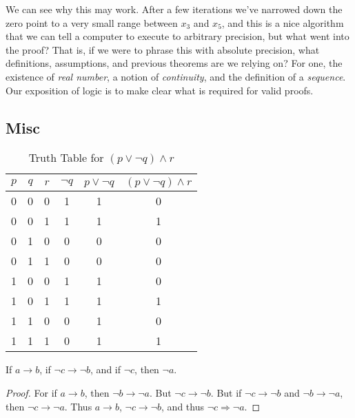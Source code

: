     We can see why this may work. After a few iterations we've narrowed down the
    zero point to a very small range between $x_{3}$ and $x_{5}$, and this is a
    nice algorithm that we can tell a computer to execute to arbitrary
    precision, but what went into the proof? That is, if we were to phrase this
    with absolute precision, what definitions, assumptions, and previous
    theorems are we relying on? For one, the existence of \textit{real number},
    a notion of \textit{continuity}, and the definition of a \textit{sequence}.
    Our exposition of logic is to make clear what is required for valid proofs.
    \subsection{Misc}
        \begin{table}[H]
            \centering
            \captionsetup{type=table}
            \begin{tabular}{c c c c c c}
                \hline
                $p$&$q$&$r$&$\neg{q}$&$p\lor\neg{q}$&$(p\lor\neg{q})\land{r}$\\
                \hline
                0&0&0&1&1&0\\
                0&0&1&1&1&1\\
                0&1&0&0&0&0\\
                0&1&1&0&0&0\\
                1&0&0&1&1&0\\
                1&0&1&1&1&1\\
                1&1&0&0&1&0\\
                1&1&1&0&1&1\\
                \hline
            \end{tabular}
            \caption{Truth Table for $(p\lor\neg{q})\land{r}$}
            \label{tab:Truth_Table_Example}
        \end{table}
        \begin{theorem}
            If $a\rightarrow{b}$, if $\neg{c}\rightarrow\neg{b}$, and if
            $\neg{c}$, then $\neg{a}$.
        \end{theorem}
        \begin{proof}
            For if $a\rightarrow{b}$, then $\neg{b}\rightarrow\neg{a}$. But
            $\neg{c}\rightarrow\neg{b}$. But if $\neg{c}\rightarrow\neg{b}$ and
            $\neg{b}\rightarrow\neg{a}$, then $\neg{c}\rightarrow\neg{a}$. Thus
            $a\rightarrow{b}$, $\neg{c}\rightarrow\neg{b}$, and thus
            $\neg{c}\Rightarrow\neg{a}$.
        \end{proof}
